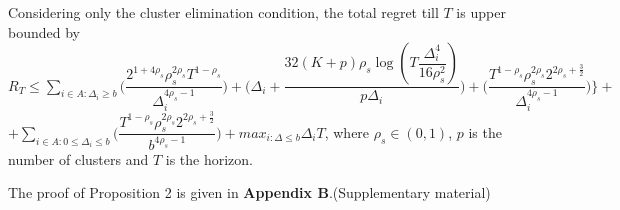 \begin{remark}
\end{remark}
	
	
	

\begin{proposition}
Considering only the cluster elimination condition, the total regret till $T$ is upper bounded by $R_{T}\leq \sum_{i\in A:\Delta_{i}\geq b}\bigg(\dfrac{2^{1+4\rho_{s}}\rho_{s}^{2\rho_{s}}T^{1-\rho_{s}}}{\Delta_{i}^{4\rho_{s}-1}}\bigg) + \bigg(\Delta_{i}+\dfrac{32(K+p)\rho_{s}\log{(T\dfrac{\Delta_{i}^{4}}{16\rho_{s}^{2}})}}{p\Delta_{i}}\bigg)  +  \bigg(\dfrac{T^{1-\rho_{s}}\rho_{s}^{2\rho_{s}}2^{2\rho_{s}+\frac{3}{2}}}{\Delta_{i}^{4\rho_{s} -1}} \bigg) \bigg \rbrace+$\newline$+\sum_{i\in A:0\leq\Delta_{i}\leq b}\bigg(\dfrac{T^{1-\rho_{s}}\rho_{s}^{2\rho_{s}}2^{2\rho_{s}+\frac{3}{2}}}{b^{4\rho_{s} -1}} \bigg) + max_{i:\Delta\leq b}\Delta_{i}T$, where $\rho_{s}\in (0,1)$, $p$ is the number of clusters and $T$ is the horizon.
\end{proposition}

	The proof of Proposition 2 is given in \textbf{Appendix B}.(Supplementary material)


